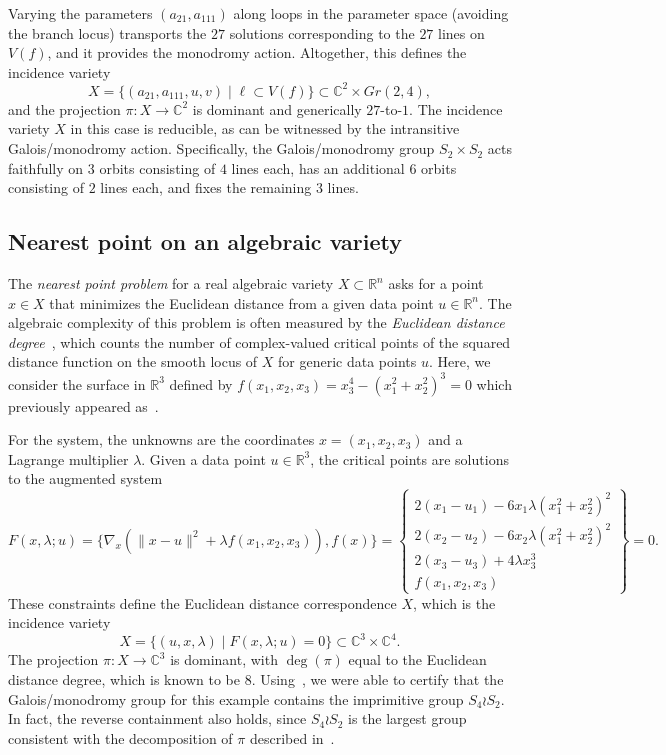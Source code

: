 \documentclass[11pt]{amsart}
\let\oldtextit\textit
\renewcommand\emph[1]{\oldtextit{\color{blue}#1}}
\theoremstyle{definition}
\theoremstyle{remark}
\begin{document}
Varying the parameters $(a_{21},a_{111})$ along loops in the parameter space (avoiding the branch locus) transports the $27$ solutions corresponding to the $27$ lines on $V(f)$, and it provides the monodromy action. Altogether, this defines the incidence variety
\begin{equation}\label{eq:27-lines-incidence}
X = \{(a_{21},a_{111},u,v) \mid \ell \subset V(f)\}
    \subset \mathbb{C}^2 \times Gr(2,4),
\end{equation}
and the projection $\pi : X \to \mathbb{C}^2$ is dominant and generically $27$-to-$1$. 
The incidence variety $X$ in this case is reducible, as can be witnessed by the intransitive Galois/monodromy action. 
Specifically, the Galois/monodromy group $S_2\times S_2$ acts faithfully on $3$ orbits consisting of $4$ lines each, has an additional $6$ orbits consisting of $2$ lines each, and fixes the remaining $3$ lines.


\subsection{Nearest point on an algebraic variety}\label{subsec:ed-degree}

The \emph{nearest point problem} for a real algebraic variety $X\subset \mathbb{R}^n$ asks for a point $x\in X$ that minimizes the Euclidean distance from a given data point $u \in \mathbb{R}^n$. The algebraic complexity of this problem is often measured by the \emph{Euclidean distance degree}~\cite{draisma2016euclidean}, which counts the number of complex-valued critical points of the squared distance function on the smooth locus of $X$ for generic data points $u.$ 
Here, we consider the surface in $\mathbb{R}^3$ defined by $f(x_1,x_2,x_3) = x_3^4 - (x_1^2 + x_2^2)^3 = 0$ which previously appeared as~\cite[Example 5]{duff2025galois}.

For the system, the unknowns are the coordinates $x=(x_1,x_2,x_3)$ and a Lagrange multiplier $\lambda$. Given a data point $u \in \mathbb{R}^3$, the critical points are solutions to the augmented system 
$$F(x,\lambda;u)=\{\nabla_x (\|x-u\|^2 + \lambda f(x_1,x_2,x_3)) ,f(x)\}=\left\{\begin{matrix}2(x_1-u_1)-6x_1\lambda(x_1^2+x_2^2)^2\\2(x_2-u_2)-6x_2\lambda(x_1^2+x_2^2)^2\\
2(x_3-u_3)+4\lambda x_3^3\\f(x_1,x_2,x_3)\end{matrix}\right\}=0.$$
These constraints define the Euclidean distance correspondence $X$, which is the incidence variety
\[
X = \{(u,x,\lambda) \mid F(x,\lambda;u)=0 \} \subset \mathbb{C}^3 \times \mathbb{C}^4.
\]
The projection $\pi :X \to \mathbb{C}^3$ is dominant, with $\deg (\pi)$ equal to the Euclidean distance degree, which is known to be $8.$
Using~, we were able to certify that the Galois/monodromy group for this example contains the imprimitive group $S_4\wr S_2.$
In fact, the reverse containment also holds, since $S_4\wr S_2$ is the largest group consistent with the decomposition of $\pi $ described in~\cite{duff2025galois}.
\end{document}
